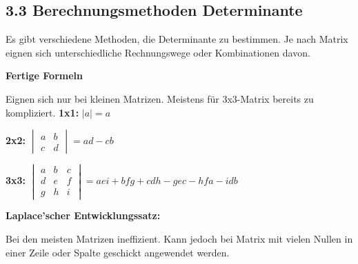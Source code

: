 \subsection{3.3 Berechnungsmethoden Determinante}{
\vskip1pt
Es gibt verschiedene Methoden, die Determinante zu bestimmen. Je nach Matrix eignen sich unterschiedliche Rechnungswege oder Kombinationen davon.

\vskip8pt

\textbf{Fertige Formeln} \par
\vskip1pt
Eignen sich nur bei kleinen Matrizen. Meistens für 3x3-Matrix bereits zu kompliziert.
\vskip6pt
\setlength\parindent{4pt}
\textbf{1x1:} $|a| = a$ \par
\vskip4pt
\textbf{2x2:} $\begin{vmatrix} a & b \\ c & d \end{vmatrix} = a d - c b$ \par
\vskip4pt
\textbf{3x3:} $\begin{vmatrix} a & b & c \\ d & e & f \\ g & h & i \end{vmatrix} = aei + bfg +cdh - gec -hfa -idb $
\setlength\parindent{0pt}
\vskip10pt

\textbf{Laplace'scher Entwicklungssatz:} \par
\vskip1pt
Bei den meisten Matrizen ineffizient. Kann jedoch bei Matrix mit vielen Nullen in einer Zeile oder Spalte geschickt angewendet werden.

}
